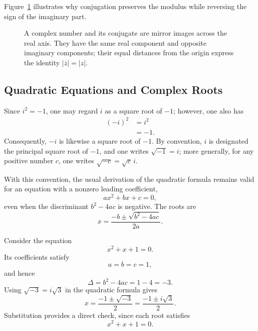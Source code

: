 Figure~\ref{fig:complex-conjugation} illustrates why conjugation preserves the modulus while reversing the sign of the imaginary part.

\begin{figure}[!htbp]
\centering
{}
\caption[Complex conjugation as reflection]{A complex number and its conjugate are mirror images across the real axis. They have the same real component and opposite imaginary components; their equal distances from the origin express the identity $|\overline{z}|=|z|$.}
\label{fig:complex-conjugation}
\end{figure}

\subsection{Quadratic Equations and Complex Roots}

Since $i^2 = -1$, one may regard $i$ as a square root of $-1$; however, one also has
\[
\begin{aligned}
(-i)^2 &= i^2 \\
&= -1.
\end{aligned}
\]
Consequently, $-i$ is likewise a square root of $-1$. By convention, $i$ is designated the principal square root of $-1$, and one writes $\sqrt{-1} = i$;
more generally, for any positive number $c$, one writes $\sqrt{-c} = \sqrt{c}\, i$.

With this convention, the usual derivation of the quadratic formula remains valid for an equation with a nonzero leading coefficient,
\[
ax^2 + bx + c = 0,
\]
even when the discriminant $b^2 - 4ac$ is negative. The roots are
\[
x = \frac{-b \pm \sqrt{b^2 - 4ac}}{2a}.
\]

\begin{example}
Consider the equation
\[
x^2+x+1=0.
\]
Its coefficients satisfy
\[
a=b=c=1,
\]
and hence
\[
\Delta=b^2-4ac=1-4=-3.
\]
Using $\sqrt{-3}=i\sqrt{3}$ in the quadratic formula gives
\[
x=\frac{-1\pm\sqrt{-3}}{2}
=\frac{-1\pm i\sqrt{3}}{2}.
\]
Substitution provides a direct check, since each root satisfies
\[
x^2+x+1=0.
\]
\end{example}

